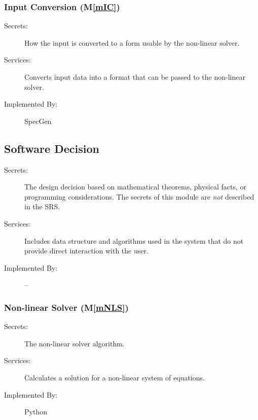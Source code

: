 \documentclass[12pt, titlepage]{article}
\newcommand{\mref}[1]{M\ref{#1}}
\newcommand{\progname}{SpecGen}
\begin{document}
\subsubsection{Input Conversion (\mref{mIC})}

\begin{description}
\item[Secrets:]How the input is converted to a form usable by the non-linear 
  solver.
\item[Services:]Converts input data into a format that can be passed to the 
  non-linear solver.
\item[Implemented By:] \progname{}
\end{description}




\subsection{Software Decision}

\begin{description}
\item[Secrets:] The design decision based on mathematical theorems, physical
  facts, or programming considerations. The secrets of this module are
  \emph{not} described in the SRS.
\item[Services:] Includes data structure and algorithms used in the system that
  do not provide direct interaction with the user. 
\item[Implemented By:] --
\end{description}

\subsubsection{Non-linear Solver (\mref{mNLS})}

\begin{description}
\item[Secrets:] The non-linear solver algorithm.
\item[Services:] Calculates a solution for a non-linear system of equations.
\item[Implemented By:] Python
\end{description}
\end{document}
